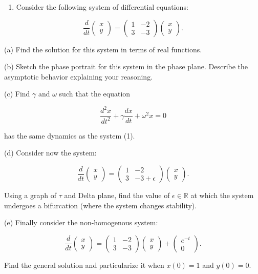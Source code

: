 \documentclass[10pt, a4paper]{article}
\begin{document}
\newpage
\begin{Problem}
\begin{enumerate}
  \item Consider the following system of differential equations:
\end{enumerate}

$$
\frac{d}{d t}\left(\begin{array}{l}
x \\
y
\end{array}\right)=\left(\begin{array}{ll}
1 & -2 \\
3 & -3
\end{array}\right)\left(\begin{array}{l}
x \\
y
\end{array}\right) .
$$

(a) Find the solution for this system in terms of real functions.

(b) Sketch the phase portrait for this system in the phase plane. Describe the asymptotic behavior explaining your reasoning.

(c) Find $\gamma$ and $\omega$ such that the equation

$$
\frac{d^{2} x}{d t^{2}}+\gamma \frac{d x}{d t}+\omega^{2} x=0
$$

has the same dynamics as the system (1).

(d) Consider now the system:

$$
\frac{d}{d t}\left(\begin{array}{l}
x \\
y
\end{array}\right)=\left(\begin{array}{cc}
1 & -2 \\
3 & -3+\epsilon
\end{array}\right)\left(\begin{array}{l}
x \\
y
\end{array}\right) .
$$

Using a graph of $\tau$ and Delta plane, find the value of $\epsilon \in \mathbb{R}$ at which the system undergoes a bifurcation (where the system changes stability).

(e) Finally consider the non-homogenous system:

$$
\frac{d}{d t}\left(\begin{array}{l}
x \\
y
\end{array}\right)=\left(\begin{array}{ll}
1 & -2 \\
3 & -3
\end{array}\right)\left(\begin{array}{l}
x \\
y
\end{array}\right)+\left(\begin{array}{c}
e^{-t} \\
0
\end{array}\right) .
$$

Find the general solution and particularize it when $x(0)=1$ and $y(0)=0$.

\end{Problem}
\end{document}
